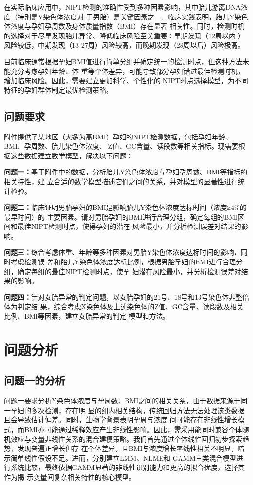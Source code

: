 \documentclass{article}
\begin{document}
在实际临床应用中，NIPT检测的准确性受到多种因素影响，其中胎儿游离DNA浓度（特别是Y染色体浓度对
于男胎）是关键因素之一。临床实践表明，胎儿Y染色体浓度与孕妇孕周数及身体质量指数（BMI）存在显著
相关性。同时，检测时机的选择对于尽早发现胎儿异常、降低临床风险至关重要：早期发现（12周以内
）风险较低，中期发现（13-27周）风险较高，而晚期发现（28周以后）风险极高。

目前临床通常根据孕妇BMI值进行简单分组并确定统一的检测时点，但这种方法未能充分考虑孕妇年龄、体
重等个体差异，可能导致部分孕妇错过最佳检测时机，增加临床风险。因此，需要建立更加科学、个性化的
NIPT时点选择模型，为不同特征的孕妇群体制定最优检测策略。

\subsection{\textbf{问题要求}}
附件提供了某地区（大多为高BMI）孕妇的NIPT检测数据，包括孕妇年龄、BMI、孕周数、胎儿染色体浓度、
Z值、GC含量、读段数等相关指标。现需要根据这些数据建立数学模型，解决以下问题：

\textbf{问题一：}基于附件中的数据，分析胎儿Y染色体浓度与孕妇孕周数、BMI等指标的相关特性，建
立合适的数学模型描述它们之间的关系，并对模型的显著性进行统计检验。

\textbf{问题二：}临床证明男胎孕妇的BMI是影响胎儿Y染色体浓度达标时间（浓度≥4\%的最早时间）的
主要因素。请对男胎孕妇的BMI进行合理分组，确定每组的BMI区间和最佳NIPT检测时点，使得孕妇的潜在
风险最小，并分析检测误差对结果的影响。

\textbf{问题三：}综合考虑体重、年龄等多种因素对男胎Y染色体浓度达标时间的影响，同时考虑检测误
差和胎儿Y染色体浓度达标比例，根据男胎孕妇的BMI进行合理分组，确定每组的最佳NIPT检测时点，使孕
妇潜在风险最小，并分析检测误差对结果的影响。

\textbf{问题四：}针对女胎异常的判定问题，以女胎孕妇的21号、18号和13号染色体非整倍体为判定结
果，综合考虑X染色体及上述染色体的Z值、GC含量、读段数及相关比例、BMI等因素，建立女胎异常的判定
模型和方法。

\section{\textbf{问题分析}}
\subsection{\textbf{问题一的分析}}
问题一要求分析Y染色体浓度与孕周数、BMI之间的相关关系，由于数据来源于同一孕妇的多次检测，存在明
显的组内相关结构，传统回归方法无法处理该类数据且会导致估计偏差。同时，生物学背景表明孕周与浓度
间可能存在非线性增长模式，而BMI亦可能通过稀释效应产生非线性影响。因此，需采用能同时兼容个体随
机效应与变量非线性关系的混合建模策略。我们首先通过个体线性回归初步探索趋势，发现普遍正增长但存
在个体差异，且BMI与浓度增长率线性相关不明显，暗示简单线性假设不足。进而，分别建立LMM、NLME和
GAMM三类混合模型进行系统比较，最终依据GAMM显著的非线性识别能力和更高的拟合优度，选择其作为揭
示变量间复杂相关特性的核心模型。
\end{document}
